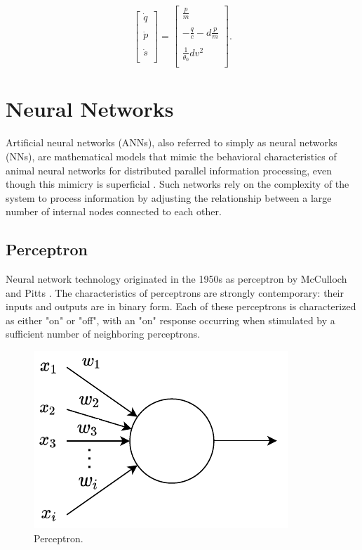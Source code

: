\documentclass[
	parskip, 			   %
	twoside, 			   %
	DIV=14, 			   %
	BCOR=15.0mm, 		   %
	headsepline, 		   %
	open=right, 		   %
	captions=tableheading, %
	bibliography=totoc,    %
	numbers=noenddot       %
]{scrreprt}
\begin{document}
\begin{equation}
    \label{eq:ODE_isothermal_damped_harmonic_oscillator}
    \begin{bmatrix}
    \dot{q}\\
    \\
    \dot{p}\\
    \\
    \dot{s}\\
    \end{bmatrix}
    =
    \begin{bmatrix}
    \frac{p}{m}\\
    \\
    -\frac{q}{c}-d\frac{p}{m}\\
    \\
    \frac{1}{\theta_{0}} d v^2\\
    \end{bmatrix}.
\end{equation}


\clearpage
\chapter{Neural Networks}
\label{ch:chapter4}
Artificial neural networks (ANNs), also referred to simply as neural networks (NNs), are mathematical models that mimic the behavioral characteristics of animal neural networks for distributed parallel information processing, even though this mimicry is superficial \cite{russell2010artificial}. Such networks rely on the complexity of the system to process information by adjusting the relationship between a large number of internal nodes connected to each other.

\section{Perceptron}
Neural network technology originated in the 1950s as perceptron by McCulloch and Pitts \cite{mcculloch1943logical}. The characteristics of perceptrons are strongly contemporary: their inputs and outputs are in binary form. Each of these perceptrons is characterized as either "on" or "off", with an "on" response occurring when stimulated by a sufficient number of neighboring perceptrons.

\begin{figure}[h!]
    \centering
    \includegraphics[scale=1]{figures/perceptron.pdf}
    \caption{Perceptron.}
    \label{fig:perceptron}
\end{figure}
\end{document}
